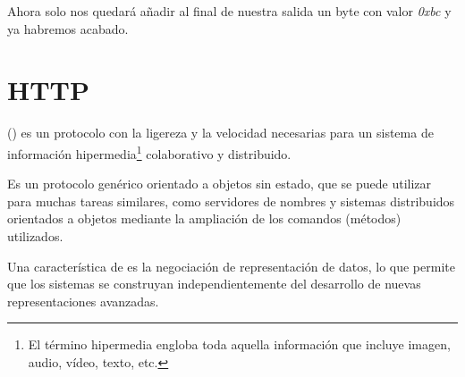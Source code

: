  Ahora solo nos quedará añadir al final de nuestra salida un byte con valor \emph{0xbc} y ya habremos acabado. \emph{\parencite{Reference17}}


 \section{HTTP}

  () es un protocolo con la ligereza y la velocidad necesarias para un sistema de información hipermedia\footnote{El término hipermedia engloba toda aquella información que incluye imagen, audio, vídeo, texto, etc.} colaborativo y distribuido.

 Es un protocolo genérico orientado a objetos sin estado, que se puede utilizar para muchas tareas similares, como servidores de nombres y sistemas distribuidos orientados a objetos mediante la ampliación de los comandos (métodos) utilizados.

 Una característica de  es la negociación de representación de datos, lo que permite que los sistemas se construyan independientemente del desarrollo de nuevas representaciones avanzadas. \emph{\parencite{Reference18}}
